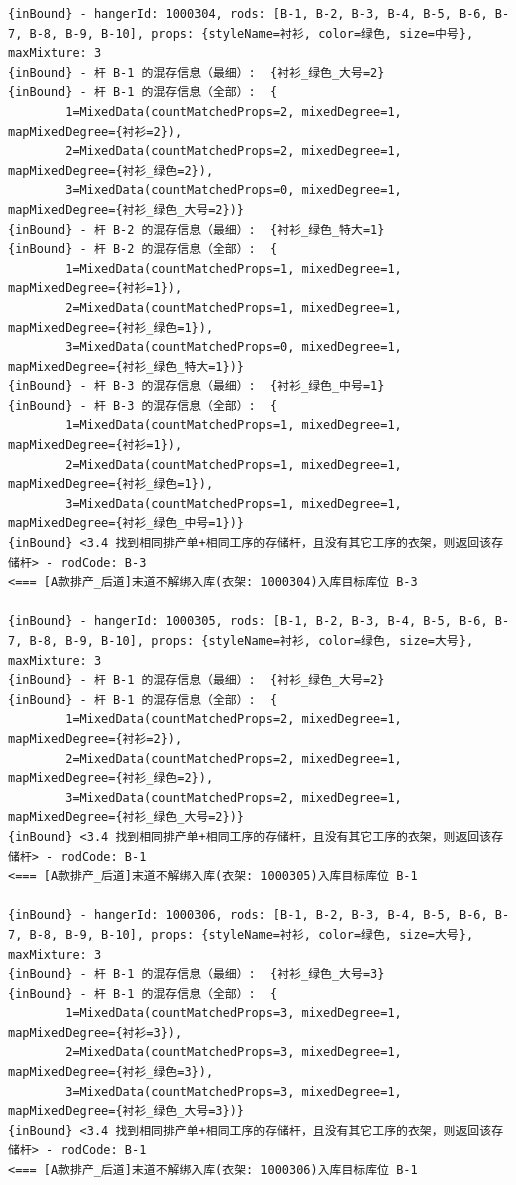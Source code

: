 {\begin{verbatim}
{inBound} - hangerId: 1000304, rods: [B-1, B-2, B-3, B-4, B-5, B-6, B-7, B-8, B-9, B-10], props: {styleName=衬衫, color=绿色, size=中号}, maxMixture: 3
{inBound} - 杆 B-1 的混存信息（最细）:  {衬衫_绿色_大号=2}
{inBound} - 杆 B-1 的混存信息（全部）:  {
		1=MixedData(countMatchedProps=2, mixedDegree=1, mapMixedDegree={衬衫=2}), 
		2=MixedData(countMatchedProps=2, mixedDegree=1, mapMixedDegree={衬衫_绿色=2}), 
		3=MixedData(countMatchedProps=0, mixedDegree=1, mapMixedDegree={衬衫_绿色_大号=2})}
{inBound} - 杆 B-2 的混存信息（最细）:  {衬衫_绿色_特大=1}
{inBound} - 杆 B-2 的混存信息（全部）:  {
		1=MixedData(countMatchedProps=1, mixedDegree=1, mapMixedDegree={衬衫=1}), 
		2=MixedData(countMatchedProps=1, mixedDegree=1, mapMixedDegree={衬衫_绿色=1}), 
		3=MixedData(countMatchedProps=0, mixedDegree=1, mapMixedDegree={衬衫_绿色_特大=1})}
{inBound} - 杆 B-3 的混存信息（最细）:  {衬衫_绿色_中号=1}
{inBound} - 杆 B-3 的混存信息（全部）:  {
		1=MixedData(countMatchedProps=1, mixedDegree=1, mapMixedDegree={衬衫=1}), 
		2=MixedData(countMatchedProps=1, mixedDegree=1, mapMixedDegree={衬衫_绿色=1}), 
		3=MixedData(countMatchedProps=1, mixedDegree=1, mapMixedDegree={衬衫_绿色_中号=1})}
{inBound} <3.4 找到相同排产单+相同工序的存储杆，且没有其它工序的衣架，则返回该存储杆> - rodCode: B-3
<=== [A款排产_后道]末道不解绑入库(衣架: 1000304)入库目标库位 B-3

{inBound} - hangerId: 1000305, rods: [B-1, B-2, B-3, B-4, B-5, B-6, B-7, B-8, B-9, B-10], props: {styleName=衬衫, color=绿色, size=大号}, maxMixture: 3
{inBound} - 杆 B-1 的混存信息（最细）:  {衬衫_绿色_大号=2}
{inBound} - 杆 B-1 的混存信息（全部）:  {
		1=MixedData(countMatchedProps=2, mixedDegree=1, mapMixedDegree={衬衫=2}), 
		2=MixedData(countMatchedProps=2, mixedDegree=1, mapMixedDegree={衬衫_绿色=2}), 
		3=MixedData(countMatchedProps=2, mixedDegree=1, mapMixedDegree={衬衫_绿色_大号=2})}
{inBound} <3.4 找到相同排产单+相同工序的存储杆，且没有其它工序的衣架，则返回该存储杆> - rodCode: B-1
<=== [A款排产_后道]末道不解绑入库(衣架: 1000305)入库目标库位 B-1

{inBound} - hangerId: 1000306, rods: [B-1, B-2, B-3, B-4, B-5, B-6, B-7, B-8, B-9, B-10], props: {styleName=衬衫, color=绿色, size=大号}, maxMixture: 3
{inBound} - 杆 B-1 的混存信息（最细）:  {衬衫_绿色_大号=3}
{inBound} - 杆 B-1 的混存信息（全部）:  {
		1=MixedData(countMatchedProps=3, mixedDegree=1, mapMixedDegree={衬衫=3}), 
		2=MixedData(countMatchedProps=3, mixedDegree=1, mapMixedDegree={衬衫_绿色=3}), 
		3=MixedData(countMatchedProps=3, mixedDegree=1, mapMixedDegree={衬衫_绿色_大号=3})}
{inBound} <3.4 找到相同排产单+相同工序的存储杆，且没有其它工序的衣架，则返回该存储杆> - rodCode: B-1
<=== [A款排产_后道]末道不解绑入库(衣架: 1000306)入库目标库位 B-1


\end{verbatim}}
